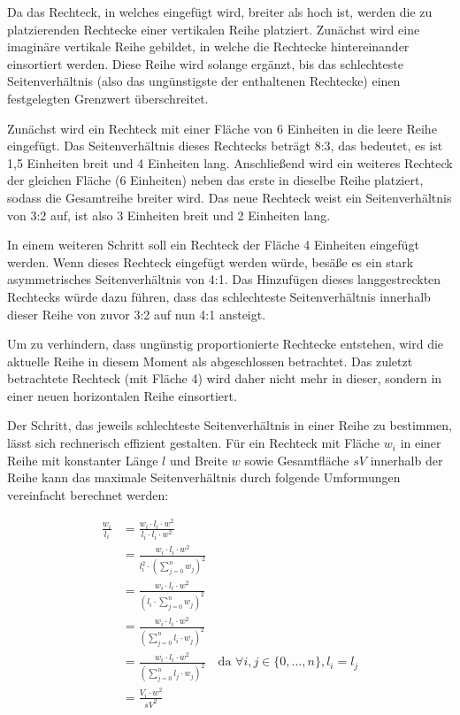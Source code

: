 Da das Rechteck, in welches eingefügt wird, breiter als hoch ist, werden die zu platzierenden Rechtecke einer vertikalen Reihe platziert. Zunächst wird eine imaginäre vertikale Reihe gebildet, in welche die Rechtecke hintereinander einsortiert werden. Diese Reihe wird solange ergänzt, bis das schlechteste Seitenverhältnis (also das ungünstigste der enthaltenen Rechtecke) einen festgelegten Grenzwert überschreitet.

Zunächst wird ein Rechteck mit einer Fläche von 6 Einheiten in die leere Reihe eingefügt. Das Seitenverhältnis dieses Rechtecks beträgt 8:3, das bedeutet, es ist 1,5 Einheiten breit und 4 Einheiten lang. Anschließend wird ein weiteres Rechteck der gleichen Fläche (6 Einheiten) neben das erste in dieselbe Reihe platziert, sodass die Gesamtreihe breiter wird. Das neue Rechteck weist ein Seitenverhältnis von 3:2 auf, ist also 3 Einheiten breit und 2 Einheiten lang.

In einem weiteren Schritt soll ein Rechteck der Fläche 4 Einheiten eingefügt werden. Wenn dieses Rechteck eingefügt werden würde, besäße es ein stark asymmetrisches Seitenverhältnis von 4:1. Das Hinzufügen dieses langgestreckten Rechtecks würde dazu führen, dass das schlechteste Seitenverhältnis innerhalb dieser Reihe von zuvor 3:2 auf nun 4:1 ansteigt.

Um zu verhindern, dass ungünstig proportionierte Rechtecke entstehen, wird die aktuelle Reihe in diesem Moment als abgeschlossen betrachtet. Das zuletzt betrachtete Rechteck (mit Fläche 4) wird daher nicht mehr in dieser, sondern in einer neuen horizontalen Reihe einsortiert.

\smallskip

Der Schritt, das jeweils schlechteste Seitenverhältnis in einer Reihe zu bestimmen, lässt sich rechnerisch effizient gestalten. Für ein Rechteck mit Fläche $w_i$ in einer Reihe mit konstanter Länge $l$ und Breite $w$ sowie Gesamtfläche $sV$ innerhalb der Reihe kann das maximale Seitenverhältnis durch folgende Umformungen vereinfacht berechnet werden:

\begin{align}
    \frac{w_i}{l_i} 
    &= \frac{w_i \cdot l_i \cdot w^2}{l_i \cdot l_i \cdot w^2} \\
    &= \frac{w_i \cdot l_i \cdot w^2}{l_i^2 \cdot \left(\sum_{j=0}^{n} w_j\right)^2} \\
    &= \frac{w_i \cdot l_i \cdot w^2}{\left(l_i \cdot \sum_{j=0}^{n} w_j\right)^2} \\
    &= \frac{w_i \cdot l_i \cdot w^2}{\left(\sum_{j=0}^{n} l_i \cdot w_j\right)^2} \\
    &= \frac{w_i \cdot l_i \cdot w^2}{\left(\sum_{j=0}^{n} l_j \cdot w_j\right)^2}
    \quad\text{da } \forall i, j \in \{0, \dots, n\}, l_i = l_j \\
    &= \frac{V_i \cdot w^2}{sV^2}
\end{align}


